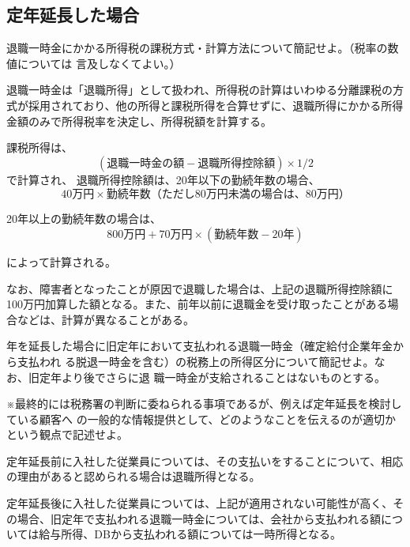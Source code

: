 \subsection{定年延長した場合}

\begin{shortanswer}[数理人試験 2020 問題7 設問1]
  退職一時金にかかる所得税の課税方式・計算方法について簡記せよ。（税率の数値については
言及しなくてよい。）
\end{shortanswer}


\begin{answerbox}
  退職一時金は「退職所得」として扱われ、所得税の計算はいわゆる分離課税の方式が採用されており、他の所得と課税所得を合算せずに、退職所得にかかる所得金額のみで所得税率を決定し、所得税額を計算する。

課税所得は、
\[
(退職一時金の額 - 退職所得控除額) × 1/2
\] で計算され、
退職所得控除額は、20年以下の勤続年数の場合、
\[
40万円 × 勤続年数（ただし80万円未満の場合は、80万円）
\]

20年以上の勤続年数の場合は、
\[
800万円 + 70万円 × (勤続年数 - 20年)
\]

によって計算される。

なお、障害者となったことが原因で退職した場合は、上記の退職所得控除額に100万円加算した額となる。また、前年以前に退職金を受け取ったことがある場合などは、計算が異なることがある。
\end{answerbox}

\begin{shortanswer}[数理人試験 2020 問題7 設問2]
年を延長した場合に旧定年において支払われる退職一時金（確定給付企業年金から支払われ
る脱退一時金を含む）の税務上の所得区分について簡記せよ。なお、旧定年より後でさらに退
職一時金が支給されることはないものとする。

※最終的には税務署の判断に委ねられる事項であるが、例えば定年延長を検討している顧客へ
の一般的な情報提供として、どのようなことを伝えるのが適切かという観点で記述せよ。
\end{shortanswer}

\begin{answerbox}
  定年延長前に入社した従業員については、その支払いをすることについて、相応の理由があると認められる場合は退職所得となる。

定年延長後に入社した従業員については、上記が適用されない可能性が高く、その場合、旧定年で支払われる退職一時金については、会社から支払われる額については給与所得、DBから支払われる額については一時所得となる。
\end{answerbox}

